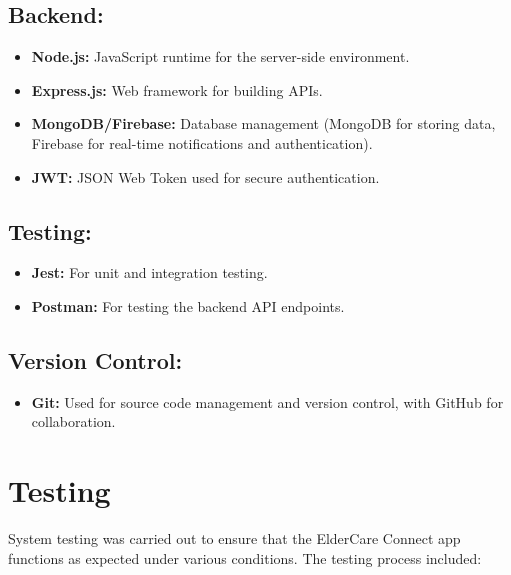 \subsection*{Backend:}
\begin{itemize}
    \item \textbf{Node.js:} JavaScript runtime for the server-side environment.
    \item \textbf{Express.js:} Web framework for building APIs.
    \item \textbf{MongoDB/Firebase:} Database management (MongoDB for storing data, Firebase for real-time notifications and authentication).
    \item \textbf{JWT:} JSON Web Token used for secure authentication.
\end{itemize}

\subsection*{Testing:}
\begin{itemize}
    \item \textbf{Jest:} For unit and integration testing.
    \item \textbf{Postman:} For testing the backend API endpoints.
\end{itemize}

\subsection*{Version Control:}
\begin{itemize}
    \item \textbf{Git:} Used for source code management and version control, with GitHub for collaboration.
\end{itemize}

\section{\System Testing}

System testing was carried out to ensure that the ElderCare Connect app functions as expected under various conditions. The testing process included:

